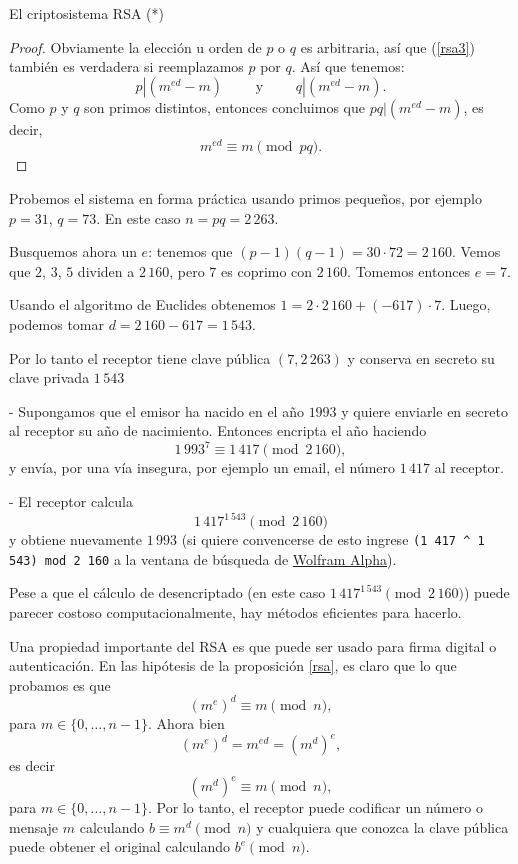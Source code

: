 \begin{section}{El criptosistema RSA (*)}
\begin{proof}
Obviamente la elección u orden de $p$ o $q$ es arbitraria, así que (\ref{rsa3}) también es verdadera si reemplazamos $p$ por $q$. Así que tenemos:
$$p|(m^{ed}-m) \qquad \text{ y } \qquad q|(m^{ed}-m).$$
Como $p$ y $q$ son primos distintos, entonces concluimos que $pq|(m^{ed}-m)$, es decir, $$m^{ed} \equiv m \pmod{pq}.$$
\end{proof}

\begin{ejemplo} Probemos el sistema en forma práctica usando primos pequeños, por ejemplo $p=31$, $q=73$. En este caso $n = pq = 2\,263$. 

Busquemos ahora un $e$:  tenemos que $ (p-1)(q-1)= 30\cdot 72 = 2\,160$. Vemos que $2$, $3$, $5$ dividen a $2\,160$, pero $7$ es coprimo con $2\,160$. 
Tomemos entonces $e = 7$.

Usando el algoritmo de Euclides obtenemos $1 = 2\cdot 2\,160 + (-617)\cdot 7$. Luego, podemos tomar $d = 2\,160 -617 =1\,543$. 

Por lo tanto el receptor tiene clave pública $(7,2\,263)$ y conserva en secreto  su clave privada $1\,543$

- Supongamos que el emisor ha nacido en el año $1993$ y quiere enviarle en secreto al receptor su año de nacimiento. Entonces encripta el año haciendo 
$$
1\,993^7 \equiv 1\,417 \pmod{2\,160},
$$   
y envía, por una vía insegura, por ejemplo un email, el número $1\,417$ al receptor.

- El receptor calcula
$$
1\,417^{1\,543} \pmod{2\,160}
$$ 
y obtiene nuevamente $1\,993$ (si quiere convencerse de esto ingrese {\tt (1\,417 \^{} 1\,543) mod 2\,160} a la ventana de búsqueda de \href{https://www.wolframalpha.com}{Wolfram Alpha}).

Pese a que el cálculo de desencriptado (en este caso $1\,417^{1\,543} \pmod{2\,160}$) puede parecer costoso computacionalmente, hay métodos eficientes para hacerlo. 

\end{ejemplo}


Una propiedad importante del RSA es que puede ser usado para firma digital o autenticación. En las hipótesis de la proposición \ref{rsa}, es claro que lo que probamos es que 
$$
(m^e)^d \equiv m \pmod{n},
$$
para $m \in \{0,\ldots,n-1\}$. Ahora bien 
$$
(m^e)^d  = m^{ed} = (m^d)^e,  
$$
es decir
$$
(m^d)^e \equiv m \pmod{n}, 
$$
para $m \in \{0,\ldots,n-1\}$. Por lo tanto, el receptor puede codificar un número o mensaje $m$ calculando  $b \equiv m^d  \pmod{n}$ y cualquiera que conozca la clave pública puede obtener el original calculando $b^e \pmod{n}$. 


\end{section}
